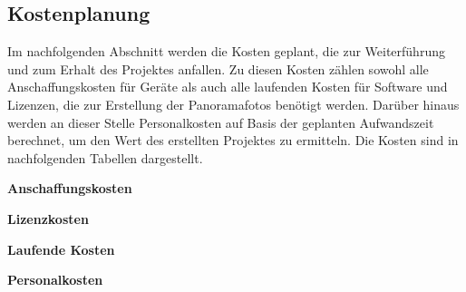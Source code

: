 \subsection{Kostenplanung}
\label{sec:Kostenplanung}

Im nachfolgenden Abschnitt werden die Kosten geplant, die zur Weiterführung und
zum Erhalt des Projektes anfallen. Zu diesen Kosten zählen sowohl alle
Anschaffungskosten für Geräte als auch alle laufenden Kosten für
Software und Lizenzen, die zur Erstellung der Panoramafotos benötigt werden.
Darüber hinaus werden an dieser Stelle Personalkosten auf Basis der geplanten
Aufwandszeit berechnet, um den Wert des erstellten Projektes zu
ermitteln.
Die Kosten sind in nachfolgenden Tabellen dargestellt. 

\clearpage
\textbf{Anschaffungskosten}

\textbf{Lizenzkosten}



\textbf{Laufende Kosten}

\clearpage
\textbf{Personalkosten}


